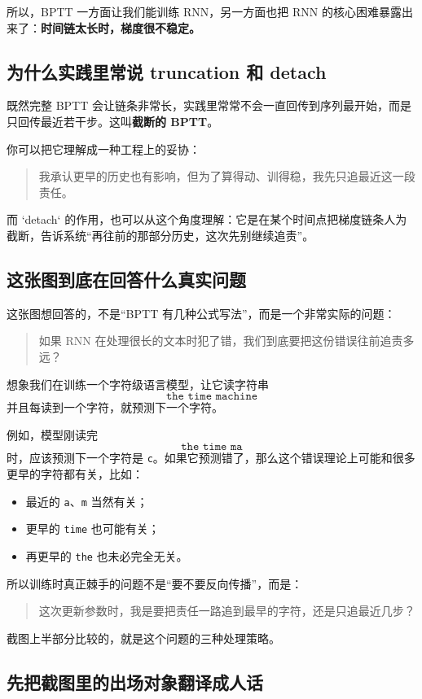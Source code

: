 \documentclass[12pt,a4paper]{ctexart}
\begin{document}
所以，BPTT 一方面让我们能训练 RNN，另一方面也把 RNN 的核心困难暴露出来了：\textbf{时间链太长时，梯度很不稳定。}

\subsection{为什么实践里常说 truncation 和 detach}

既然完整 BPTT 会让链条非常长，实践里常常不会一直回传到序列最开始，而是只回传最近若干步。这叫\textbf{截断的 BPTT}。

你可以把它理解成一种工程上的妥协：
\begin{quote}
我承认更早的历史也有影响，但为了算得动、训得稳，我先只追最近这一段责任。
\end{quote}

而 `detach` 的作用，也可以从这个角度理解：它是在某个时间点把梯度链条人为截断，告诉系统“再往前的那部分历史，这次先别继续追责”。

\subsection{这张图到底在回答什么真实问题}

这张图想回答的，不是“BPTT 有几种公式写法”，而是一个非常实际的问题：
\begin{quote}
如果 RNN 在处理很长的文本时犯了错，我们到底要把这份错误往前追责多远？
\end{quote}

想象我们在训练一个字符级语言模型，让它读字符串
\[
\texttt{the time machine}
\]
并且每读到一个字符，就预测下一个字符。

例如，模型刚读完
\[
\texttt{the time ma}
\]
时，应该预测下一个字符是 \texttt{c}。如果它预测错了，那么这个错误理论上可能和很多更早的字符都有关，比如：
\begin{itemize}
  \item 最近的 \texttt{a}、\texttt{m} 当然有关；
  \item 更早的 \texttt{time} 也可能有关；
  \item 再更早的 \texttt{the} 也未必完全无关。
\end{itemize}

所以训练时真正棘手的问题不是“要不要反向传播”，而是：
\begin{quote}
这次更新参数时，我是要把责任一路追到最早的字符，还是只追最近几步？
\end{quote}

截图上半部分比较的，就是这个问题的三种处理策略。

\subsection{先把截图里的出场对象翻译成人话}
\end{document}
